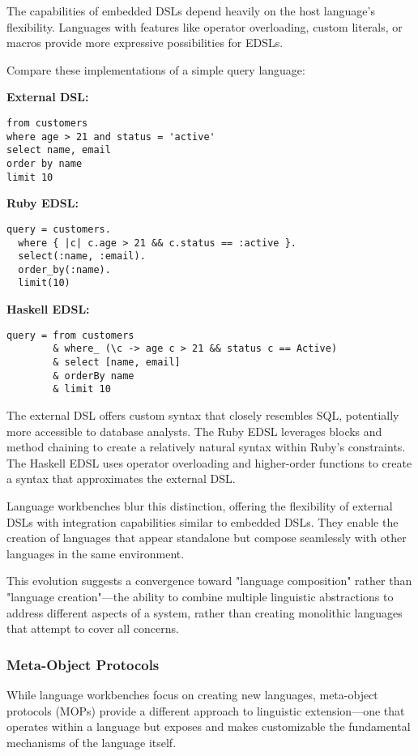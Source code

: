 \documentclass[11pt]{article}
\begin{document}
The capabilities of embedded DSLs depend heavily on the host language's flexibility. Languages with features like operator overloading, custom literals, or macros provide more expressive possibilities for EDSLs.

Compare these implementations of a simple query language:

\textbf{\textbf{External DSL:}}
\begin{verbatim}
from customers
where age > 21 and status = 'active'
select name, email
order by name
limit 10
\end{verbatim}

\textbf{\textbf{Ruby EDSL:}}
\begin{verbatim}
query = customers.
  where { |c| c.age > 21 && c.status == :active }.
  select(:name, :email).
  order_by(:name).
  limit(10)
\end{verbatim}

\textbf{\textbf{Haskell EDSL:}}
\begin{verbatim}
query = from customers
        & where_ (\c -> age c > 21 && status c == Active)
        & select [name, email]
        & orderBy name
        & limit 10
\end{verbatim}

The external DSL offers custom syntax that closely resembles SQL, potentially more accessible to database analysts. The Ruby EDSL leverages blocks and method chaining to create a relatively natural syntax within Ruby's constraints. The Haskell EDSL uses operator overloading and higher-order functions to create a syntax that approximates the external DSL.

Language workbenches blur this distinction, offering the flexibility of external DSLs with integration capabilities similar to embedded DSLs. They enable the creation of languages that appear standalone but compose seamlessly with other languages in the same environment.

This evolution suggests a convergence toward "language composition" rather than "language creation"—the ability to combine multiple linguistic abstractions to address different aspects of a system, rather than creating monolithic languages that attempt to cover all concerns.
\subsubsection{Meta-Object Protocols}
\label{sec:org6c9b531}

While language workbenches focus on creating new languages, meta-object protocols (MOPs) provide a different approach to linguistic extension—one that operates within a language but exposes and makes customizable the fundamental mechanisms of the language itself.
\end{document}
